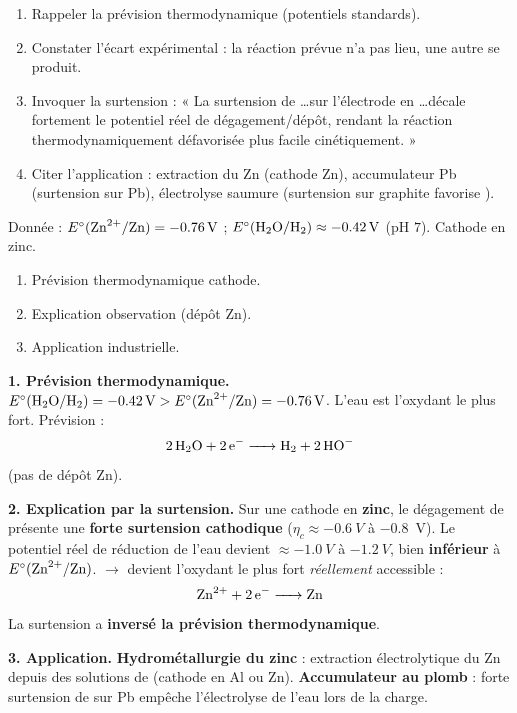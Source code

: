 \documentclass[11pt]{article}
\newcommand{\cle}[1]{{\popxbold\color{popdark}#1}}
\begin{document}
\begin{methode}
\begin{enumerate}
\item \cle{Rappeler la prévision thermodynamique} (potentiels standards).
\item \cle{Constater l'écart expérimental} : la réaction prévue n'a pas lieu, une autre se produit.
\item \cle{Invoquer la surtension} : « La surtension de \ldots sur l'électrode en \ldots décale fortement le potentiel réel de dégagement/dépôt, rendant la réaction thermodynamiquement défavorisée plus facile cinétiquement. »
\item \cle{Citer l'application} : extraction du Zn (cathode Zn), accumulateur Pb (surtension  sur Pb), électrolyse saumure (surtension  sur graphite favorise ).
\end{enumerate}
\end{methode}

\begin{exoresolu}
Donnée : $E^\circ(\ce{Zn^2+}/\ce{Zn}) = \SI{-0,76}{V}$ ; $E^\circ(\ce{H2O}/\ce{H2}) \approx \SI{-0,42}{V}$ (pH $7$). Cathode en zinc.
\begin{enumerate}
\item Prévision thermodynamique cathode.
\item Explication observation (dépôt Zn).
\item Application industrielle.
\end{enumerate}
\tcblower
\textbf{1. Prévision thermodynamique.}
$E^\circ(\ce{H2O}/\ce{H2}) = \SI{-0,42}{V} > E^\circ(\ce{Zn^2+}/\ce{Zn}) = \SI{-0,76}{V}$.
L'eau est l'oxydant le plus fort. Prévision : \[ \ce{2 H2O + 2 e- -> H2 + 2 HO-} \] (pas de dépôt Zn).

\textbf{2. Explication par la surtension.}
Sur une cathode en \textbf{zinc}, le dégagement de  présente une \textbf{forte surtension cathodique} ($\eta_c \approx \SI{-0,6}{V}$ à \SI{-0,8}{V}). Le potentiel réel de réduction de l'eau devient $\approx \SI{-1,0}{V}$ à $\SI{-1,2}{V}$, bien \textbf{inférieur} à $E^\circ(\ce{Zn^2+}/\ce{Zn})$.
$\rightarrow$  devient l'oxydant le plus fort \emph{réellement} accessible : \[ \ce{Zn^2+ + 2 e- -> Zn} \]
La surtension a \textbf{inversé la prévision thermodynamique}.

\textbf{3. Application.}
\textbf{Hydrométallurgie du zinc} : extraction électrolytique du Zn depuis des solutions de  (cathode en Al ou Zn). \textbf{Accumulateur au plomb} : forte surtension de  sur Pb empêche l'électrolyse de l'eau lors de la charge.
\end{exoresolu}
\end{document}
